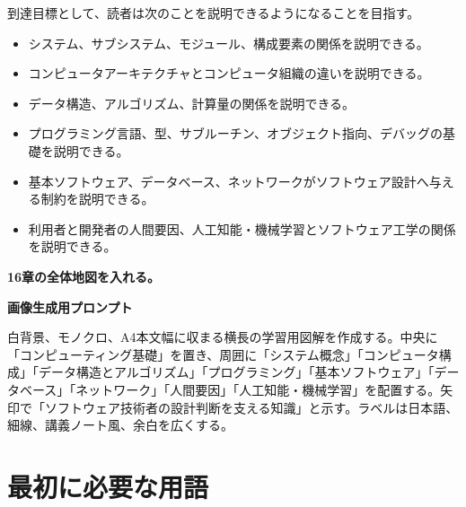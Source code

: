 \documentclass[a4paper,11pt]{ltjsarticle}
\begin{document}
到達目標として、読者は次のことを説明できるようになることを目指す。

\begin{itemize}[leftmargin=2em]
\item システム、サブシステム、モジュール、構成要素の関係を説明できる。
\item コンピュータアーキテクチャとコンピュータ組織の違いを説明できる。
\item データ構造、アルゴリズム、計算量の関係を説明できる。
\item プログラミング言語、型、サブルーチン、オブジェクト指向、デバッグの基礎を説明できる。
\item 基本ソフトウェア、データベース、ネットワークがソフトウェア設計へ与える制約を説明できる。
\item 利用者と開発者の人間要因、人工知能・機械学習とソフトウェア工学の関係を説明できる。
\end{itemize}

\begin{todobox}
\textbf{16章の全体地図を入れる。}\par
\textbf{画像生成用プロンプト}\par
白背景、モノクロ、A4本文幅に収まる横長の学習用図解を作成する。中央に「コンピューティング基礎」を置き、周囲に「システム概念」「コンピュータ構成」「データ構造とアルゴリズム」「プログラミング」「基本ソフトウェア」「データベース」「ネットワーク」「人間要因」「人工知能・機械学習」を配置する。矢印で「ソフトウェア技術者の設計判断を支える知識」と示す。ラベルは日本語、細線、講義ノート風、余白を広くする。

\end{todobox}

\section{最初に必要な用語}
\end{document}
